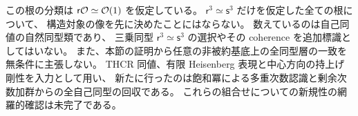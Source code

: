 この根の分類は $\mathsf r\mathcal O\simeq\mathcal O(1)$ を仮定している。
$\mathsf r^3\simeq\mathsf s^3$ だけを仮定した全ての根について、
構造対象の像を先に決めたことにはならない。
数えているのは自己同値の自然同型類であり、
三乗同型 $\mathsf r^3\simeq\mathsf s^3$ の選択やその coherence を追加標識としてはいない。
また、本節の証明から任意の非被約基底上の全同型層の一致を無条件に主張しない。
THCR 同値、有限 Heisenberg 表現と中心方向の持上げ剛性を入力として用い、
新たに行ったのは飽和冪による多重次数認識と剰余次数加群からの全自己同型の回収である。
これらの組合せについての新規性の網羅的確認は未完了である。

